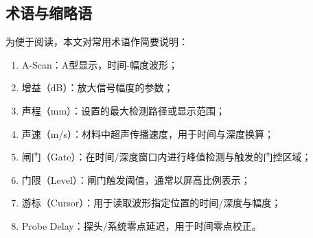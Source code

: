 \subsection{术语与缩略语}
\par
为便于阅读，本文对常用术语作简要说明：
\begin{enumerate}
	\item A-Scan：A型显示，时间-幅度波形；
	\item 增益（dB）：放大信号幅度的参数；
	\item 声程（mm）：设置的最大检测路径或显示范围；
	\item 声速（m/s）：材料中超声传播速度，用于时间与深度换算；
	\item 闸门（Gate）：在时间/深度窗口内进行峰值检测与触发的门控区域；
	\item 门限（Level）：闸门触发阈值，通常以屏高比例表示；
	\item 游标（Cursor）：用于读取波形指定位置的时间/深度与幅度；
	\item Probe Delay：探头/系统零点延迟，用于时间零点校正。
\end{enumerate}
